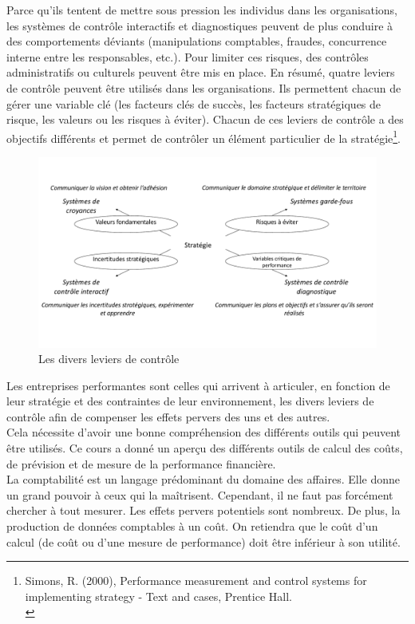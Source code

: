 \documentclass{tufte-handout}
\begin{document}
\begin{enumerate}
Parce qu'ils tentent de mettre sous pression les individus dans les organisations, les systèmes de contrôle interactifs et diagnostiques peuvent de plus conduire à des comportements déviants (manipulations comptables, fraudes, concurrence interne entre les responsables, etc.). Pour limiter ces risques, des contrôles administratifs ou culturels peuvent être mis en place. En résumé, quatre leviers de contrôle peuvent être utilisés dans les organisations. Ils permettent chacun de gérer une variable clé (les facteurs clés de succès, les facteurs stratégiques de risque, les valeurs ou les risques à éviter). Chacun de ces leviers de contrôle a des objectifs différents et permet de contrôler un élément particulier de la stratégie\footnote{Simons, R. (2000), Performance measurement and control systems for implementing strategy - Text and cases, Prentice Hall.\\}.\\

\begin{figure}[htbp]
\centering
\includegraphics[width=.9\linewidth]{./img/levers.pdf}
\caption{Les divers leviers de contrôle}
\end{figure}

Les entreprises performantes sont celles qui arrivent à articuler, en fonction de leur stratégie et des contraintes de leur environnement, les divers leviers de contrôle afin de compenser les effets pervers des uns et des autres.\\

Cela nécessite d'avoir une bonne compréhension des différents outils qui peuvent être utilisés. Ce cours a donné un aperçu des différents outils de calcul des coûts, de prévision et de mesure de la performance financière.\\

La comptabilité est un langage prédominant du domaine des affaires. Elle donne un grand pouvoir à ceux qui la maîtrisent. Cependant, il ne faut pas forcément chercher à tout mesurer. Les effets pervers potentiels sont nombreux. De plus, la production de données comptables à un coût. On retiendra que le coût d’un calcul (de coût ou d'une mesure de performance) doit être inférieur à son utilité.\\
\end{enumerate}
\end{document}
